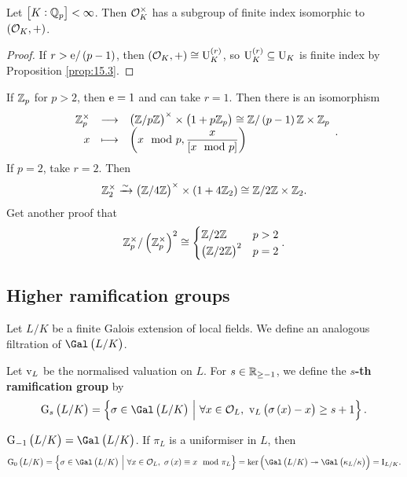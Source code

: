 \pagebreak

\begin{corollary}
Let $ \sbr{K : \QQ_p} < \infty $. Then $ \mathcal{O}_K^\times $ has a subgroup of finite index isomorphic to $ \br{\OOO_K, +} $.
\end{corollary}

\begin{proof}
If $ r > \e / \br{p - 1} $, then $ \br{\OOO_K, +} \cong \U_K^{\br{r}} $, so $ \U_K^{\br{r}} \subseteq \U_K $ is finite index by Proposition \ref{prop:15.3}.
\end{proof}

\begin{example*}
If $ \mathbb{Z}_p $ for $ p > 2 $, then $ \mathrm{e} = 1 $ and can take $ r = 1 $. Then there is an isomorphism
$$ \function{\ZZ_p^\times}{\br{\ZZ / p\ZZ}^\times \times \br{1 + p\ZZ_p} \cong \ZZ / \br{p - 1}\ZZ \times \ZZ_p}{x}{\br{x \mod p, \dfrac{x}{\sbr{x \mod p}}}}. $$
If $ p = 2 $, take $ r = 2 $. Then
$$ \ZZ_2^\times \xrightarrow{\sim} \br{\ZZ / 4\ZZ}^\times \times \br{1 + 4\ZZ_2} \cong \ZZ / 2\ZZ \times \ZZ_2. $$
Get another proof that
$$ \ZZ_p^\times / \br{\ZZ_p^\times}^2 \cong
\begin{cases}
\ZZ / 2\ZZ & p > 2 \\
\br{\ZZ / 2\ZZ}^2 & p = 2
\end{cases}.
$$
\end{example*}

\subsection{Higher ramification groups}

Let $ L / K $ be a finite Galois extension of local fields. We define an analogous filtration of $ \Gal\br{L / K} $.

\begin{definition}
Let $ \mathrm{v}_L $ be the normalised valuation on $ L $. For $ s \in \mathbb{R}_{\ge -1} $, we define the \textbf{$ s $-th ramification group} by
$$ \G_s\br{L / K} = \cbr{\sigma \in \Gal\br{L / K} \st \forall x \in \OOO_L, \ \v_L\br{\sigma\br{x} - x} \ge s + 1}. $$
\end{definition}

\begin{example*}
$ \G_{-1}\br{L / K} = \Gal\br{L / K} $. If $ \pi_L $ is a uniformiser in $ L $, then
$$ \G_0\br{L / K} = \cbr{\sigma \in \Gal\br{L / K} \st \forall x \in \OOO_L, \ \sigma\br{x} \equiv x \mod \pi_L} = \ker \br{\Gal\br{L / K} \twoheadrightarrow \Gal\br{\kappa_L / \kappa}} = \I_{L / K}. $$
\end{example*}

